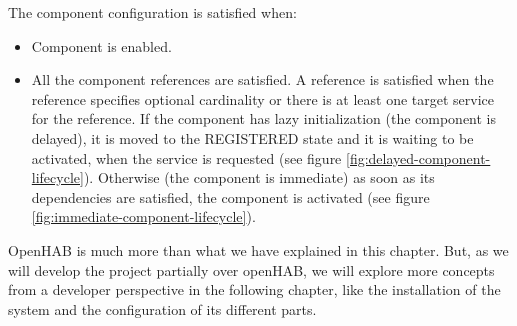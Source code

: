 The component configuration is satisfied when:
\begin{itemize}
	\item Component is enabled.
	\item All the component references are satisfied. A reference is satisfied when the reference specifies optional cardinality or
	there is at least one target service for the reference. If the component has lazy initialization (the component is delayed), it is
	moved to the REGISTERED state and it is waiting to be activated, when the service is requested (see figure
	\ref{fig:delayed-component-lifecycle}).
	Otherwise (the component is immediate) as soon as its dependencies are satisfied, the component is activated (see figure
	\ref{fig:immediate-component-lifecycle}).
\end{itemize}

\bigskip
OpenHAB is much more than what we have explained in this chapter. But, as we will develop the project partially over openHAB,
we will explore more concepts from a developer perspective in the following chapter, like the installation of the system and the
configuration of its different parts.
